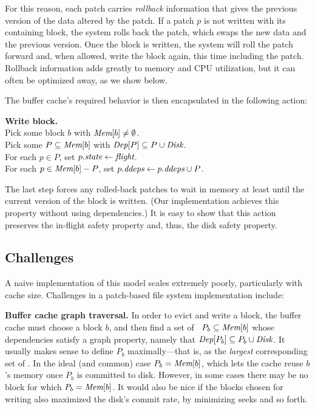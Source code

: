 For this reason, each patch carries \emph{rollback} information that gives
the previous version of the data altered by the patch.
%
If a patch $p$ is not written with its containing block, the system rolls
back the patch, which swaps the new data and the previous version.
%
Once the block is written, the system will roll the patch forward and, when
allowed, write the block again, this time including the patch.
%
Rollback information adds greatly to memory and CPU utilization, but it can
often be optimized away, as we show below.


The buffer cache's required behavior is then encapsulated in the following
action:

\begin{tabbing}
\textbf{Write block.} \\
\quad Pick some block $b$ with $\PMem[b] \neq \emptyset$. \\
\quad Pick some $P \subseteq \PMem[b]$ with $\PDepset{P} \subseteq P \cup
\PDisk$. \\
\quad For each $p \in P$, set $p.\textit{state} \gets \textit{flight}$. \\
\quad For each $p \in \PMem[b]-P$, set $\PDDepset{p} \gets \PDDepset{p}
\cup P$.
\end{tabbing}

\noindent
%
The last step forces any rolled-back patches to wait in memory at least
until the current version of the block is written.  (Our implementation
achieves this property without using dependencies.)
%
It is easy to show that this action preserves the in-flight safety property
and, thus, the disk safety property.





\subsection{Challenges}

A naive implementation of this model scales extremely poorly,
particularly with cache size.
%
Challenges in a patch-based file system implementation include:

\textbf{Buffer cache graph traversal.}
%
In order to evict and write a block, the buffer cache must choose a block
$b$,
%
and then find a set of \patches\ $P_b \subseteq \PMem[b]$ whose dependencies
satisfy a graph property, namely that $\PDepset{P_b} \subseteq P_b \cup
\PDisk$.
%
It usually makes sense to define $P_b$ maximally---that is, as the
\emph{largest} corresponding set of \patches.
%
In the ideal (and common) case $P_b = \PMem[b]$, which lets the cache reuse
$b$'s memory once $P_b$ is committed to disk.  However, in some cases there
may be no block for which $P_b = \PMem[b]$.
%
It would also be nice if the blocks chosen for writing also maximized the
disk's commit rate, by minimizing seeks and so forth.

